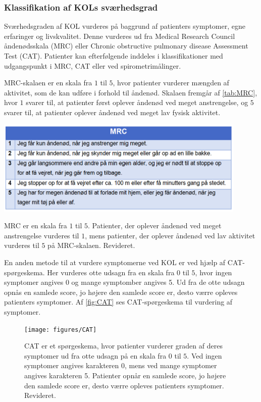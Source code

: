 \subsubsection{Klassifikation af KOLs sværhedsgrad} \label{sec:klassifikation}
Sværhedsgraden af KOL vurderes på baggrund af patienters symptomer, egne erfaringer og livskvalitet. Denne vurderes ud fra Medical Research Council åndenødsskala (MRC) eller Chronic obstructive pulmonary disease Assessment Test (CAT). Patienter kan efterfølgende inddeles i klassifikationer med udgangspunkt i MRC, CAT eller ved spirometrimålinger.\cite{Basisbogen2016}

 
MRC-skalaen er en skala fra $1$ til $5$, hvor patienter vurderer mængden af aktivitet, som de kan udføre i forhold til åndenød. Skalaen fremgår af \autoref{tab:MRC}, hvor $1$ svarer til, at patienter først oplever åndenød ved meget anstrengelse, og $5$ svarer til, at patienter oplever åndenød ved meget lav fysisk aktivitet.\cite{Basisbogen2016}

\begin{table} [H]
\centering
\includegraphics[width=0.9\textwidth]{figures/MRC}
\caption{MRC er en skala fra $1$ til $5$. Patienter, der oplever åndenød ved meget anstrengelse vurderes til $1$, mens patienter, der oplever åndenød ved lav aktivitet vurderes til $5$ på MRC-skalaen. Revideret\cite{Basisbogen2016}.}
\label{tab:MRC}
\end{table} 

\noindent
En anden metode til at vurdere symptomerne ved KOL er ved hjælp af CAT-spørgeskema. Her vurderes otte udsagn fra en skala fra $0$ til $5$, hvor ingen symptomer angives $0$ og mange symptomber angives 5. Ud fra de otte udsagn opnås en samlede score, jo højere den samlede score er, desto værre opleves patienters symptomer. Af \autoref{fig:CAT} ses CAT-spørgeskema til vurdering af symptomer.\cite{dsam2016,Basisbogen2016}

\begin{figure} [H]
\centering
\texttt{[image: figures/CAT]}
\caption{CAT er et spørgeskema, hvor patienter vurderer graden af deres symptomer ud fra otte udsagn på en skala fra $0$ til $5$. Ved ingen symptomer angives karakteren 0, mens ved mange symptomer angives karakteren 5. Patienter opnår en samlede score, jo højere den samlede score er, desto værre opleves patienters symptomer. Revideret\cite{Basisbogen2016}.}
\label{fig:CAT}
\end{figure} 


